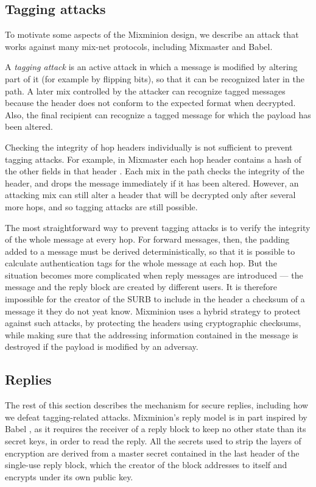 \documentclass[11pt]{IEEEtran}
\begin{document}
\subsection{Tagging attacks}
\label{subsec:tagging-attacks}

To motivate some aspects of the Mixminion design, we describe an attack
that works against many mix-net protocols, including Mixmaster and Babel.

A {\em tagging attack} is an active attack in which a message is
modified by altering part of it (for example by flipping bits), so
that it can be recognized later in the path.  A later mix controlled by
the attacker can recognize tagged messages because the header does
not conform to the expected format when decrypted.  Also, the final
recipient can recognize a tagged message for which the payload has
been altered.

Checking the integrity of hop headers individually is not
sufficient to prevent tagging attacks.  For example, in Mixmaster
each hop header contains a hash of the other fields in that header
\cite{mixmaster-spec}.
Each mix in the path checks the integrity of the header, and drops
the message immediately if it has been altered.  However, 
an attacking mix can still alter a header that will be decrypted
only after several more hops, and so tagging attacks are still possible.

The most straightforward way to prevent tagging attacks is to
verify the integrity of the whole message at every hop.  For forward messages,
then, the padding added to a message must be derived deterministically,
so that it is possible to calculate
authentication tags for the whole message at each hop.  But
the situation becomes more complicated when reply messages are
introduced --- the message and the reply block are
created by different users. It is therefore impossible for the creator
of the SURB to include in the header a checksum of a message it they
do not yeat know. Mixminion uses a hybrid strategy to protect against
such attacks, by protecting the headers using cryptographic checksums,
while making sure that the addressing information contained in the
message is destroyed if the payload is modified by an adversay.

\subsection{Replies}
\label{subsec:replies}

The rest of this section describes the mechanism for secure replies,
including how we defeat tagging-related attacks. Mixminion's reply
model is in part inspired by Babel \cite{babel}, as it requires the
receiver of a reply block to keep no other state than its secret keys,
in order to read the reply.  All the secrets used
to strip the layers of encryption are derived from a master
secret contained in the last header of the single-use reply block, which
the creator of the block addresses to itself and encrypts under its
own public key.
\end{document}
